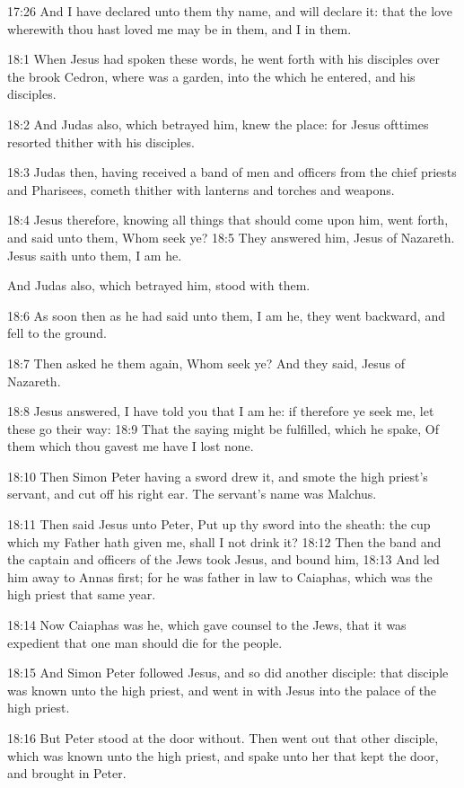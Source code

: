 17:26 And I have declared unto them thy name, and will declare it:
that the love wherewith thou hast loved me may be in them, and I in
them.

18:1 When Jesus had spoken these words, he went forth with his
disciples over the brook Cedron, where was a garden, into the which he
entered, and his disciples.

18:2 And Judas also, which betrayed him, knew the place: for Jesus
ofttimes resorted thither with his disciples.

18:3 Judas then, having received a band of men and officers from the
chief priests and Pharisees, cometh thither with lanterns and torches
and weapons.

18:4 Jesus therefore, knowing all things that should come upon him,
went forth, and said unto them, Whom seek ye?  18:5 They answered him,
Jesus of Nazareth. Jesus saith unto them, I am he.

And Judas also, which betrayed him, stood with them.

18:6 As soon then as he had said unto them, I am he, they went
backward, and fell to the ground.

18:7 Then asked he them again, Whom seek ye? And they said, Jesus of
Nazareth.

18:8 Jesus answered, I have told you that I am he: if therefore ye
seek me, let these go their way: 18:9 That the saying might be
fulfilled, which he spake, Of them which thou gavest me have I lost
none.

18:10 Then Simon Peter having a sword drew it, and smote the high
priest's servant, and cut off his right ear. The servant's name was
Malchus.

18:11 Then said Jesus unto Peter, Put up thy sword into the sheath:
the cup which my Father hath given me, shall I not drink it?  18:12
Then the band and the captain and officers of the Jews took Jesus, and
bound him, 18:13 And led him away to Annas first; for he was father in
law to Caiaphas, which was the high priest that same year.

18:14 Now Caiaphas was he, which gave counsel to the Jews, that it was
expedient that one man should die for the people.

18:15 And Simon Peter followed Jesus, and so did another disciple:
that disciple was known unto the high priest, and went in with Jesus
into the palace of the high priest.

18:16 But Peter stood at the door without. Then went out that other
disciple, which was known unto the high priest, and spake unto her
that kept the door, and brought in Peter.

